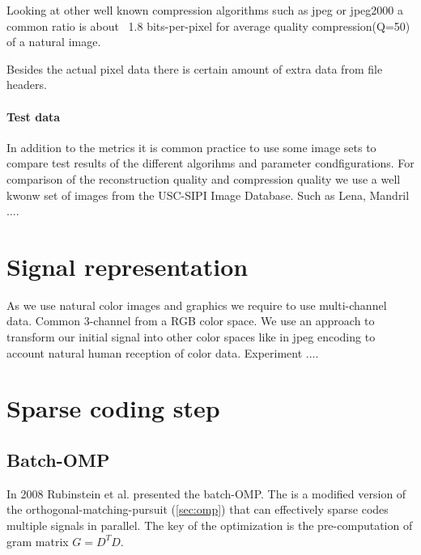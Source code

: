 Looking at other well known compression algorithms such as jpeg or jpeg2000 a common ratio 
is about ~1.8 bits-per-pixel for average quality compression(Q=50) of a natural image. 

Besides the actual pixel data there is certain amount of extra data from file headers. 

\paragraph{Test data}
In addition to the metrics it is common practice to use some image sets to compare test results of the different algorihms and parameter condfigurations.
For comparison of the reconstruction quality and compression quality we use a well kwonw set of images from the 
USC-SIPI Image Database. Such as Lena, Mandril ....

\section{Signal representation}
As we use natural color images and graphics we require to use multi-channel data. Common 3-channel from a RGB color space.
We use an approach to transform our initial signal into other color spaces like in jpeg encoding to account natural human reception of
color data. 
Experiment ....


\section{Sparse coding step}
\subsection{Batch-OMP}
In 2008 Rubinstein et al. \cite{Rubinstein2008} presented the batch-OMP. 
The  is a modified version of the orthogonal-matching-pursuit (\ref{sec:omp}) 
that can effectively sparse codes multiple signals in parallel. 
The key of the optimization is the pre-computation of gram matrix $G=D^TD$.

